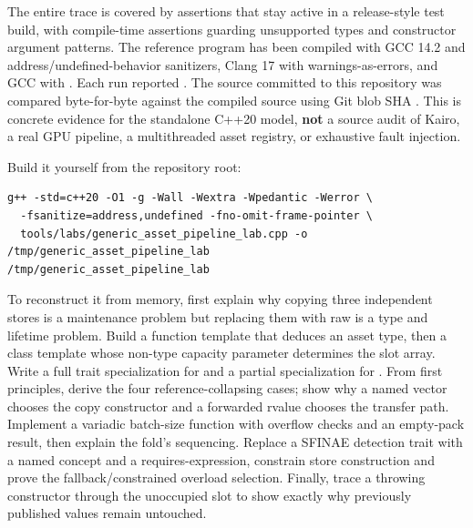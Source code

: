 The entire trace is covered by assertions that stay active in a release-style test build, with compile-time assertions guarding unsupported types and constructor argument patterns. The reference program has been compiled with GCC 14.2 and address/undefined-behavior sanitizers, Clang 17 with warnings-as-errors, and GCC with . Each run reported . The source committed to this repository was compared byte-for-byte against the compiled source using Git blob SHA . This is concrete evidence for the standalone C++20 model, \textbf{not} a source audit of Kairo, a real GPU pipeline, a multithreaded asset registry, or exhaustive fault injection.

Build it yourself from the repository root:

\begin{verbatim}
g++ -std=c++20 -O1 -g -Wall -Wextra -Wpedantic -Werror \
  -fsanitize=address,undefined -fno-omit-frame-pointer \
  tools/labs/generic_asset_pipeline_lab.cpp -o /tmp/generic_asset_pipeline_lab
/tmp/generic_asset_pipeline_lab
\end{verbatim}

To reconstruct it from memory, first explain why copying three independent stores is a maintenance problem but replacing them with raw  is a type and lifetime problem. Build a function template that deduces an asset type, then a class template whose non-type capacity parameter determines the slot array. Write a full trait specialization for  and a partial specialization for . From first principles, derive the four reference-collapsing cases; show why a named vector chooses the copy constructor and a forwarded rvalue chooses the transfer path. Implement a variadic batch-size function with overflow checks and an empty-pack result, then explain the fold's sequencing. Replace a SFINAE detection trait with a named concept and a requires-expression, constrain store construction and prove the fallback/constrained overload selection. Finally, trace a throwing constructor through the unoccupied slot to show exactly why previously published values remain untouched.

